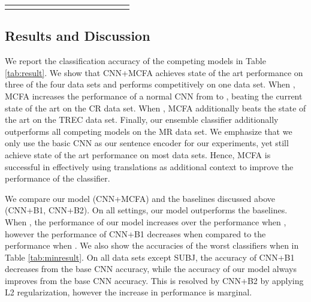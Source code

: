 \documentclass{article}
\begin{document}
\begin{table*}[htbp]
\begin{tabular}{|c|ccc|ccc|ccc|ccc|}
{{		\hline
	\end{tabular}\caption{Classification accuracies of competing models. \textbf{C} refers to the additional context,  refers to the number of translations. In TopCNN, word refers to using word-specific topic while sentence refers to using sentence-specific topic. 
Accuracies colored \textcolor[rgb]{1,0,0}{red} are accuracies that perform worse than CNN. Previous state of the art results and the results of our best model are \textbf{bold-faced}. The winning result is \underline{underlined}. The number inside the parenthesis indicates the increase from the base model, CNN.}
	\label{tab:result}\end{table*}

\subsection{Results and Discussion}

We report the classification accuracy of the competing models in Table \ref{tab:result}. We show that CNN+MCFA achieves state of the art performance on three of the four data sets and performs competitively on one data set. When , MCFA increases the performance of a normal CNN from  to , beating the current state of the art on the CR data set. When , MCFA additionally beats the state of the art on the TREC data set. Finally, our ensemble classifier additionally outperforms all competing models on the MR data set. We emphasize that we only use the basic CNN as our sentence encoder for our experiments, yet still achieve state of the art performance on most data sets. Hence, MCFA is successful in effectively using translations as additional context to improve the performance of the classifier.

We compare our model (CNN+MCFA) and the baselines discussed above (CNN+B1, CNN+B2). On all settings, our model outperforms the baselines. When , the performance of our model increases over the performance when , however the performance of CNN+B1 decreases when compared to the performance when . We also show the accuracies of the worst classifiers when  in Table \ref{tab:minresult}. On all data sets except SUBJ, the accuracy of CNN+B1 decreases from the base CNN accuracy, while the accuracy of our model always improves from the base CNN accuracy.
This is resolved by CNN+B2 by applying L2 regularization, however the increase in performance is marginal. 
\end{document}
